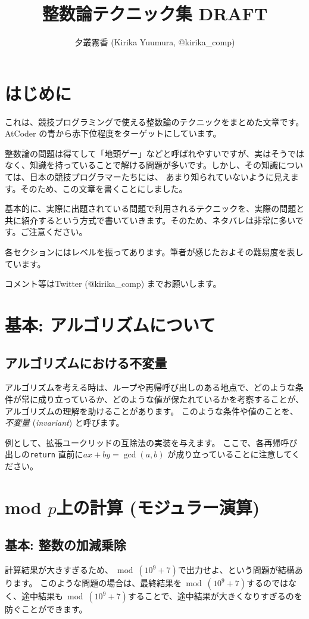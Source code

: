 \documentclass{jsarticle}
\author{夕叢霧香 (Kirika Yuumura, @kirika\_comp)}
\title{整数論テクニック集 DRAFT}
\begin{document}
\maketitle
 \section*{はじめに}
 これは、競技プログラミングで使える整数論のテクニックをまとめた文章です。
 AtCoder の青から赤下位程度をターゲットにしています。

 整数論の問題は得てして「地頭ゲー」などと呼ばれやすいですが、実はそうではなく、知識を持っていることで解ける問題が多いです。しかし、その知識については、日本の競技プログラマーたちには、
 あまり知られていないように見えます。そのため、この文章を書くことにしました。

 基本的に、実際に出題されている問題で利用されるテクニックを、実際の問題と共に紹介するという方式で書いていきます。そのため、ネタバレは非常に多いです。ご注意ください。

 各セクションにはレベルを振ってあります。筆者が感じたおよその難易度を表しています。

 コメント等はTwitter (@kirika\_comp) までお願いします。
\tableofcontents
 \section{基本: アルゴリズムについて}
  \subsection{アルゴリズムにおける不変量}
  \label{subsec:invariant}
  アルゴリズムを考える時は、ループや再帰呼び出しのある地点で、どのような条件が常に成り立っているか、どのような値が保たれているかを考察することが、アルゴリズムの理解を助けることがあります。
  このような条件や値のことを、\emph{不変量} (\emph{invariant}) と呼びます。

  例として、拡張ユークリッドの互除法の実装を与えます。
  ここで、各再帰呼び出しの\verb+return+ 直前に$ax+by=\gcd(a,b)$ が成り立っていることに注意してください。
  
 \section{mod $p$上の計算 (モジュラー演算)}
 \label{sec:mod-p-arithmetic}
  \subsection{基本: 整数の加減乗除}
  計算結果が大きすぎるため、${} \bmod (10^9+7)$で出力せよ、という問題が結構あります。
  このような問題の場合は、最終結果を${} \bmod (10^9+7)$するのではなく、途中結果も${} \bmod (10^9+7)$することで、途中結果が大きくなりすぎるのを防ぐことができます。
\end{document}

